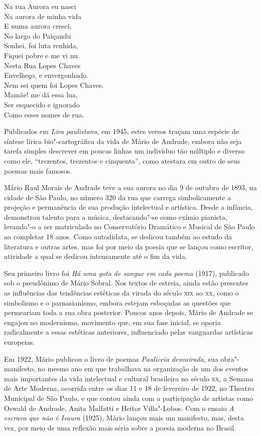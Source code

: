 

\epigraph{Na rua Aurora eu nasci\\
Na aurora de minha vida\\
E numa aurora cresci.\\[5pt]
No largo do Paiçandu\\
Sonhei, foi luta renhida,\\
Fiquei pobre e me vi nu.\\[5pt]
Nesta Rua Lopes Chaves\\
Envelheço, e envergonhado.\\
Nem sei quem foi Lopes Chaves.\\[5pt]
Mamãe! me dá essa lua,\\
Ser esquecido e ignorado\\
Como esses nomes de rua.}{}

Publicados em
\emph{Lira paulistana}, em 1945, estes versos traçam uma espécie de
síntese lírica bio"-cartográfica da vida de Mário de Andrade, embora não
seja tarefa simples descrever em poucas linhas um indivíduo tão múltiplo
e diverso como ele, ``trezentos, trezentos e cinquenta'', como atestara
em outro de seus poemas mais famosos.

Mário Raul Morais de Andrade teve a sua aurora no dia 9 de outubro de
1893, na cidade de São Paulo, no número 320 da rua que carrega
simbolicamente a projeção e permanência de sua produção intelectual e
artística. Desde a infância, demonstrou talento para a música,
destacando"-se como exímio pianista, levando"-o a ser matriculado no
Conservatório Dramático e Musical de São Paulo ao completar 18 anos.
Como autodidata, se dedicou também ao estudo da literatura e outras
artes, mas foi por meio da poesia que se lançou como escritor, atividade
a qual se dedicou intensamente até o fim da vida.

Seu primeiro livro foi \emph{Há uma gota de sangue em cada poema}
(1917), publicado sob o pseudônimo de Mário Sobral. Nos textos de
estreia, ainda estão presentes as influências das tendências estéticas
da virada do século \textsc{xix} ao \textsc{xx}, como o simbolismo e o parnasianismo,
embora estejam esboçadas as questões que permeariam toda a sua obra
posterior. Poucos anos depois, Mário de Andrade se engajou no
modernismo, movimento que, em sua fase inicial, se oporia radicalmente a
essas estéticas anteriores, influenciado pelas vanguardas artísticas
europeias.

Em 1922, Mário publicou o livro de poemas \emph{Pauliceia desvairada},
sua obra"-manifesto, no mesmo ano em que trabalhava na organização de um
dos eventos mais importantes da vida intelectual e cultural brasileira
no século \textsc{xx}, a Semana de Arte Moderna, ocorrida entre os dias 11 e 18
de fevereiro de 1922, no Theatro Municipal de São Paulo, e que contou
ainda com a participação de artistas como Oswald de Andrade, Anita
Malfatti e Heitor Villa"-Lobos. Com o ensaio \emph{A escrava que não é
Isaura} (1925), Mário lançou mais um manifesto, mas, desta vez, por meio
de uma reflexão mais séria sobre a poesia moderna no Brasil.

